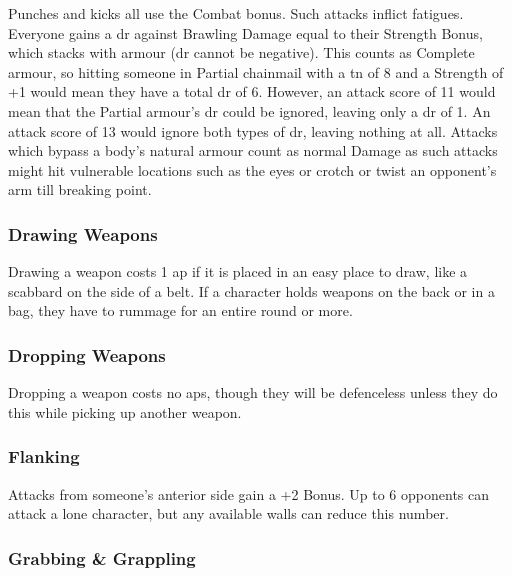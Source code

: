 \begin{multicols}{2}
Punches and kicks all use the Combat bonus.
Such attacks inflict \glspl{fatigue}.
Everyone gains a \gls{dr} against Brawling Damage equal to their Strength Bonus, which stacks with armour (\gls{dr} cannot be negative).
This counts as Complete armour, so hitting someone in Partial chainmail with a \gls{tn} of 8 and a Strength of +1 would mean they have a total \gls{dr} of 6.
However, an attack score of 11 would mean that the Partial armour's \gls{dr} could be ignored, leaving only a \gls{dr} of 1.
An attack score of 13 would ignore both types of \gls{dr}, leaving nothing at all.
Attacks which bypass a body's natural armour count as normal Damage as such attacks might hit vulnerable locations such as the eyes or crotch or twist an opponent's arm till breaking point.

\subsubsection[Drawing Weapon -- Cost: 1 \glsentrytext{ap}]{Drawing Weapons}

Drawing a weapon costs 1 \gls{ap} if it is placed in an easy place to draw, like a scabbard on the side of a belt.
If a character holds weapons on the back or in a bag, they have to rummage for an entire round or more.

\subsubsection[Dropping Weapon -- Cost: 0 \gls{ap}]{Dropping Weapons}

Dropping a weapon costs no \glspl{ap}, though they will be defenceless unless they do this while picking up another weapon.

\subsubsection[Flanking: Gain +2 to attack]{Flanking}\label{flank}

Attacks from someone's anterior side gain a +2 Bonus.
Up to 6 opponents can attack a lone character, but any available walls can reduce this number.


\subsubsection{Grabbing \& Grappling}
\label{grappling}


\end{multicols}
